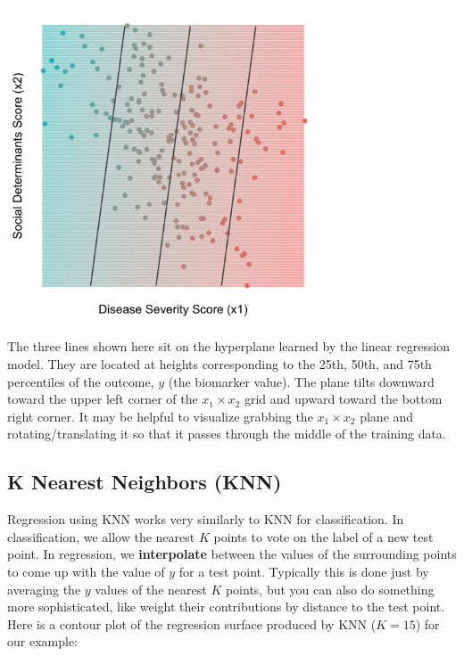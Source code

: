 \begin{center}
\includegraphics[width=0.7\textwidth]{img/esl-reg-linear.png}
\end{center}
The three lines shown here sit on the hyperplane learned by the linear regression model. They are located at heights corresponding to the 25th, 50th, and 75th percentiles of the outcome, $y$ (the biomarker value). The plane tilts downward toward the upper left corner of the $x_1 \times x_2$ grid and upward toward the bottom right corner. It may be helpful to visualize grabbing the $x_1 \times x_2$ plane and rotating/translating it so that it passes through the middle of the training data.   

\subsection{K Nearest Neighbors (KNN)}

Regression using KNN works very similarly to KNN for classification. In classification, we allow the nearest $K$ points to vote on the label of a new test point. In regression, we \textbf{interpolate} between the values of the surrounding points to come up with the value of $y$ for a test point. Typically this is done just by averaging the $y$ values of the nearest $K$ points, but you can also do something more sophisticated, like weight their contributions by distance to the test point. Here is a contour plot of the regression surface produced by KNN ($K=15$) for our example:

